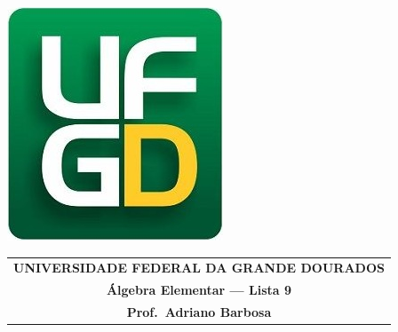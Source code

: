 \documentclass[a4paper,5pt]{amsbook}
\begin{document}
\thispagestyle{empty}
\pagestyle{empty}
\begin{minipage}[h]{0.14\textwidth}
	\includegraphics[scale=0.24]{../ufgd.png}
\end{minipage}
\begin{minipage}[h]{\textwidth}
\begin{tabular}{c}
{{\bf UNIVERSIDADE FEDERAL DA GRANDE DOURADOS}}\\
{{\bf \'Algebra Elementar --- Lista 9}}\\
{{\bf Prof.\ Adriano Barbosa}}\\
\end{tabular}
\vspace{-0.45cm}
%
\end{minipage}

\end{document}
